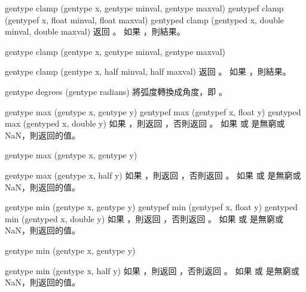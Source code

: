 gentype clamp (gentype x,
		gentype minval,
		gentype maxval)
gentypef clamp (gentypef x,
		float minval,
		float maxval)
gentyped clamp (gentyped x,
		double minval,
		double maxval)
\stopbuffer
{}
返回 。
如果 ，則結果。
\stopbuffer

gentype clamp (gentype x,
		gentype minval,
		gentype maxval)

gentype clamp (gentype x,
		half minval,
		half maxval)
\stopbuffer
{}
返回 。
如果 ，則結果。
\stopbuffer

gentype degrees (gentype radians)
\stopbuffer
{}
將弧度轉換成角度，即 。
\stopbuffer

gentype max (gentype x, gentype y)
gentypef max (gentypef x, float y)
gentyped max (gentyped x, double y)
\stopbuffer
{}
如果 ，則返回 ，否則返回 。
如果  或  是無窮或 NaN，則返回的值。
\stopbuffer

gentype max (gentype x, gentype y)

gentype max (gentype x, half y)
\stopbuffer
{}
如果 ，則返回 ，否則返回 。
如果  或  是無窮或 NaN，則返回的值。
\stopbuffer

gentype min (gentype x, gentype y)
gentypef min (gentypef x, float y)
gentyped min (gentyped x, double y)
\stopbuffer
{}
如果 ，則返回 ，否則返回 。
如果  或  是無窮或 NaN，則返回的值。
\stopbuffer

gentype min (gentype x, gentype y)

gentype min (gentype x, half y)
\stopbuffer
{}
如果 ，則返回 ，否則返回 。
如果  或  是無窮或 NaN，則返回的值。
\stopbuffer

